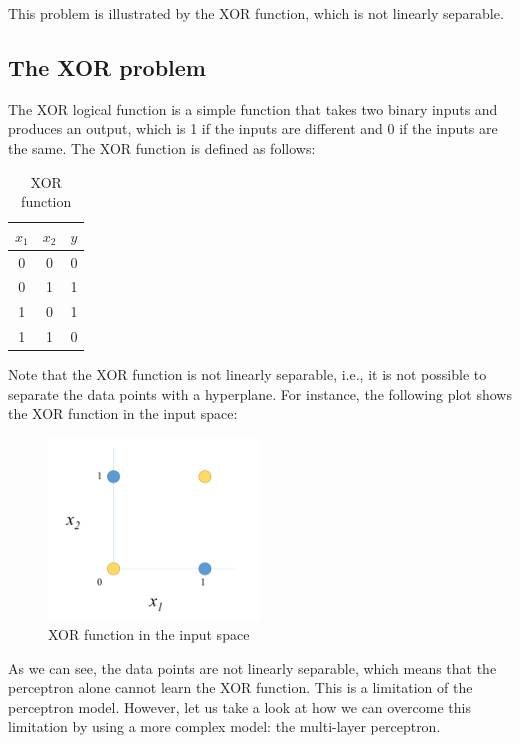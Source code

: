 This problem is illustrated by the XOR function, which is not linearly separable.

\subsection{The XOR problem}

The XOR logical function is a simple function that takes two binary inputs and 
produces an output, which is 1 if the inputs are different and 0 if the inputs 
are the same. The XOR function is defined as follows:

\begin{table}[H]
    \centering
    \begin{tabular}{|c|c|c|}
        \hline
        $x_1$ & $x_2$ & $y$\\
        \hline
        0 & 0 & 0\\
        0 & 1 & 1\\
        1 & 0 & 1\\
        1 & 1 & 0\\
        \hline
    \end{tabular}
    \caption{XOR function}
\end{table}

Note that the XOR function is not linearly separable, i.e., it is not possible to
separate the data points with a hyperplane. For instance, the following plot shows
the XOR function in the input space:

\begin{figure}[H]
    \centering
    \includegraphics[width=0.5\textwidth]{figures/xor_plot.png}
    \caption{XOR function in the input space}
    \label{fig:xor_plot}
\end{figure}

As we can see, the data points are not linearly separable, which means that 
the perceptron alone cannot learn the XOR function. This is a limitation of
the perceptron model. However, let us take a look at how we can overcome this
limitation by using a more complex model: the multi-layer perceptron.

